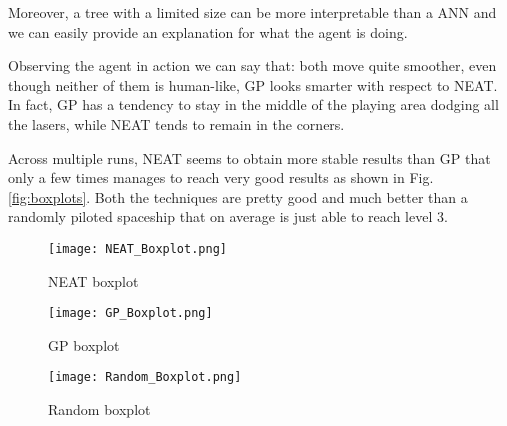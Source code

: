 Moreover, a tree with a limited size can be more interpretable than a ANN and we can easily
provide an explanation for what the agent is doing.

Observing the agent in action we can say that: both move quite smoother, even though
neither of them is human-like, GP looks smarter with respect to NEAT. In fact, GP has a
tendency to stay in the middle of the playing area dodging all the lasers, while NEAT tends to
remain in the corners.

Across multiple runs, NEAT seems to obtain more stable results than GP that only a few
times manages to reach very good results as shown in Fig. \ref{fig:boxplots}. Both the techniques are
pretty good and much better than a randomly piloted spaceship that on average is just able
to reach level 3.


\begin{figure*}
    \centering
    \begin{subfigure}[b]{0.3\textwidth}
        \centering
        \texttt{[image: NEAT\_Boxplot.png]}
        \caption{NEAT boxplot}
    \end{subfigure}
    \hfill
    \begin{subfigure}[b]{0.3\textwidth}
        \centering
        \texttt{[image: GP\_Boxplot.png]}
        \caption{GP boxplot}
    \end{subfigure}
    \hfill
    \begin{subfigure}[b]{0.3\textwidth}
        \centering
        \texttt{[image: Random\_Boxplot.png]}
        \caption{Random boxplot}
    \end{subfigure}
       \caption{Comparison between boxplots of NEAT, GP and randomly piloted spaceships.}
       \label{fig:boxplots}
\end{figure*}